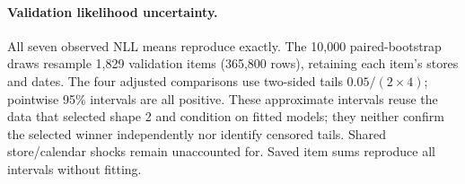 \paragraph{Validation likelihood uncertainty.}
All seven observed NLL means reproduce exactly. The 10,000 paired-bootstrap draws resample 1,829 validation items (365,800 rows), retaining each item's stores and dates. The four adjusted comparisons use two-sided tails $0.05/(2\times4)$; pointwise 95\% intervals are all positive. These approximate intervals reuse the data that selected shape 2 and condition on fitted models; they neither confirm the selected winner independently nor identify censored tails. Shared store/calendar shocks remain unaccounted for. Saved item sums reproduce all intervals without fitting.
